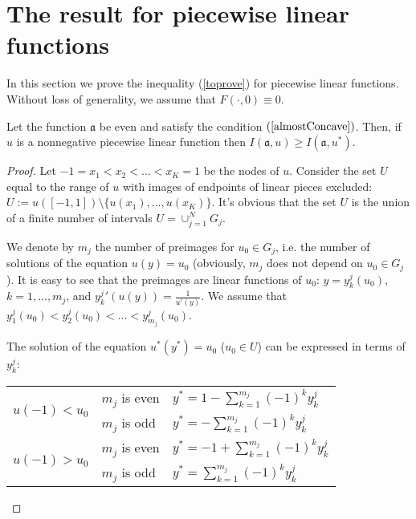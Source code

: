 \section{The result for piecewise linear functions}

\rm
In this section we prove the inequality (\ref{toprove}) for piecewise linear functions.
Without loss of generality, we assume that $F(\cdot, 0) \equiv 0$.

\begin{thm}
\label{linth}
Let the function $\mathfrak a$ be even and satisfy the condition $(\ref{almostConcave})$.
Then, if $u$ is a nonnegative piecewise linear function then $I(\mathfrak a, u) \ge I(\mathfrak a, u^*)$.
\end{thm}

\begin{proof}
Let $-1 = x_1 < x_2 < \dots < x_K = 1$ be the nodes of $u$.
Consider the set $U$ equal to the range of $u$ with images of endpoints of linear pieces excluded:
$U := u( [-1, 1] ) \setminus \{ u(x_1), \dots, u(x_K) \}$.
It's obvious that the set $U$ is the union of a finite number of intervals $U = \cup_{j = 1}^N G_j$.

We denote by $m_j$ the number of preimages for $u_0 \in G_j$,
i.e. the number of solutions of the equation $u(y) = u_0$
(obviously, $m_j$ does not depend on $u_0 \in G_j$).
It is easy to see that the preimages are linear functions of $u_0$:
$y = y_k^j(u_0)$, $k = 1, \dots, m_j$,
and $y_k^j{}'(u(y)) = \frac{1}{u'(y)}$.
We assume that $y_1^j(u_0) < y_2^j(u_0) < \dots < y_{m_j}^j(u_0)$.

The solution of the equation $u^*(y^*)=u_0$ ($u_0 \in U$) can be expressed in terms of $y_k^j$:

\begin{center}
\begin{tabular}{l|l|l} 
\multirow{2}{*}{$u(-1)<u_0$ \rule[-34pt]{0pt}{65pt}} & $m_j$ is even & $y^*=1-\sum\limits_{k=1}^{m_j} (-1)^k y_k^j$ \rule[-17pt]{0pt}{40pt} \\
                                                     & $m_j$ is odd  & $y^*=-\sum\limits_{k=1}^{m_j} (-1)^k y_k^j$ \rule[-17pt]{0pt}{40pt} \\ \hline
\multirow{2}{*}{$u(-1)>u_0$ \rule[-34pt]{0pt}{65pt}} & $m_j$ is even & $y^*=-1+\sum\limits_{k=1}^{m_j} (-1)^k y_k^j$ \rule[-17pt]{0pt}{40pt} \\
                                                     & $m_j$ is odd  & $y^*=\sum\limits_{k=1}^{m_j} (-1)^k y_k^j$ \rule[-17pt]{0pt}{40pt} \\ 
\end{tabular}
\end{center}


\end{proof}
